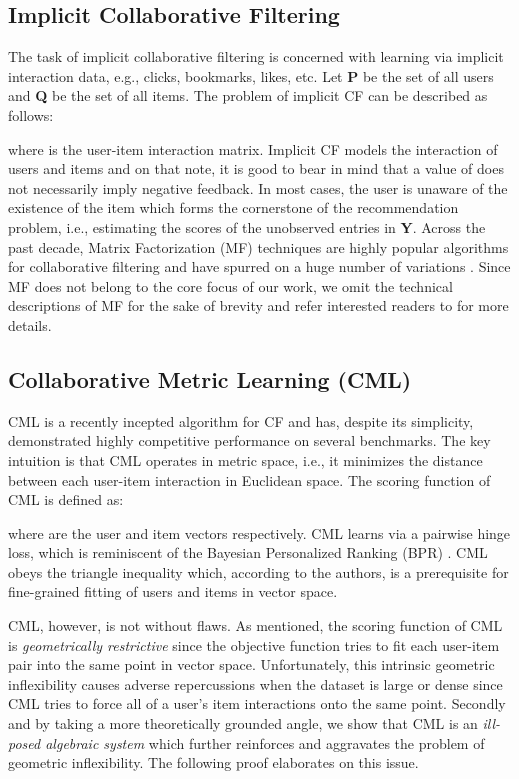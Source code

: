 \documentclass[sigconf]{acmart}
\begin{document}
\subsection{Implicit Collaborative Filtering}
The task of implicit collaborative filtering is concerned with learning via implicit interaction data, e.g., clicks, bookmarks, likes, etc. Let \textbf{P} be the set of all users and \textbf{Q} be the set of all items. The problem of implicit CF can be described as follows:

where  is the user-item interaction matrix. Implicit CF models the interaction of users and items and on that note, it is good to bear in mind that a value of  does not necessarily imply negative feedback. In most cases, the user is unaware of the existence of the item which forms the cornerstone of the recommendation problem, i.e., estimating the scores of the unobserved entries in \textbf{Y}. Across the past decade, Matrix Factorization (MF) techniques are highly popular algorithms for collaborative filtering and have spurred on a huge number of variations \cite{He:2017:NCF:3038912.3052569,DBLP:conf/sigir/HeZKC16}. Since MF does not belong to the core focus of our work, we omit the technical descriptions of MF for the sake of brevity and refer interested readers to \cite{He:2017:NCF:3038912.3052569,DBLP:conf/www/HsiehYCLBE17} for more details. 

\subsection{Collaborative Metric Learning (CML)}
\label{sec:cml}
CML \cite{DBLP:conf/www/HsiehYCLBE17} is a recently incepted algorithm for CF and has, despite its simplicity, demonstrated highly competitive performance on several benchmarks. The key intuition is that CML operates in metric space, i.e., it minimizes the distance between each user-item interaction in Euclidean space. The scoring function of CML is defined as:

where  are the user and item vectors respectively. CML learns via a pairwise hinge loss, which is reminiscent of the Bayesian Personalized Ranking (BPR) \cite{DBLP:conf/uai/RendleFGS09}. CML obeys the triangle inequality which, according to the authors, is a prerequisite for fine-grained fitting of users and items in vector space. 

CML, however, is not without flaws. As mentioned, the scoring function of CML is \textit{geometrically restrictive} since the objective function tries to fit each user-item pair into the same point in vector space. Unfortunately, this intrinsic geometric inflexibility causes adverse repercussions when the dataset is large or dense since CML tries to force all of a user's item interactions onto the same point. Secondly and by taking a more theoretically grounded angle, we show that CML is an \textit{ill-posed algebraic system} \cite{illposed} which further reinforces and aggravates the problem of geometric inflexibility. The following proof elaborates on this issue. 
\end{document}
